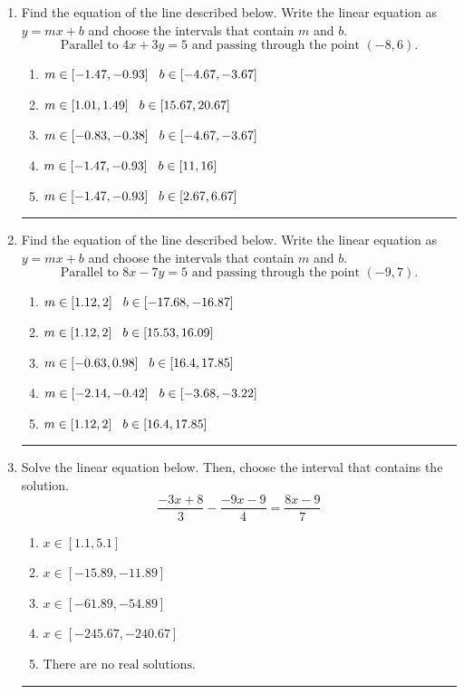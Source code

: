 \documentclass[14pt]{extbook}
\newcommand{\litem}[1]{\item#1\hspace*{-1cm}\rule{\textwidth}{0.4pt}}
\begin{document}
\begin{enumerate}
{\begin{enumerate}[label=\Alph*.]
\end{enumerate} }
\litem{
Find the equation of the line described below. Write the linear equation as $ y=mx+b $ and choose the intervals that contain $m$ and $b$.\[ \text{Parallel to } 4 x + 3 y = 5 \text{ and passing through the point } (-8, 6). \]\begin{enumerate}[label=\Alph*.]
\item \( m \in [-1.47, -0.93] \hspace*{3mm} b \in [-4.67, -3.67] \)
\item \( m \in [1.01, 1.49] \hspace*{3mm} b \in [15.67, 20.67] \)
\item \( m \in [-0.83, -0.38] \hspace*{3mm} b \in [-4.67, -3.67] \)
\item \( m \in [-1.47, -0.93] \hspace*{3mm} b \in [11, 16] \)
\item \( m \in [-1.47, -0.93] \hspace*{3mm} b \in [2.67, 6.67] \)

\end{enumerate} }
\litem{
Find the equation of the line described below. Write the linear equation as $ y=mx+b $ and choose the intervals that contain $m$ and $b$.\[ \text{Parallel to } 8 x - 7 y = 5 \text{ and passing through the point } (-9, 7). \]\begin{enumerate}[label=\Alph*.]
\item \( m \in [1.12, 2] \hspace*{3mm} b \in [-17.68, -16.87] \)
\item \( m \in [1.12, 2] \hspace*{3mm} b \in [15.53, 16.09] \)
\item \( m \in [-0.63, 0.98] \hspace*{3mm} b \in [16.4, 17.85] \)
\item \( m \in [-2.14, -0.42] \hspace*{3mm} b \in [-3.68, -3.22] \)
\item \( m \in [1.12, 2] \hspace*{3mm} b \in [16.4, 17.85] \)

\end{enumerate} }
\litem{
Solve the linear equation below. Then, choose the interval that contains the solution.\[ \frac{-3x + 8}{3} - \frac{-9x -9}{4} = \frac{8x -9}{7} \]\begin{enumerate}[label=\Alph*.]
\item \( x \in [1.1, 5.1] \)
\item \( x \in [-15.89, -11.89] \)
\item \( x \in [-61.89, -54.89] \)
\item \( x \in [-245.67, -240.67] \)
\item \( \text{There are no real solutions.} \)


\end{enumerate}}
\end{enumerate}
\end{document}
